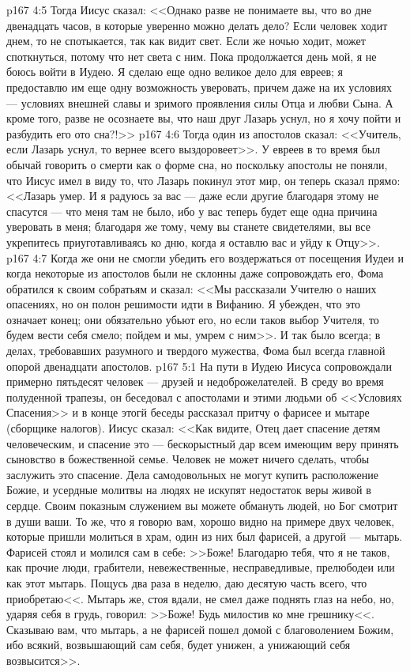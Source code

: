\vs p167 4:5 Тогда Иисус сказал: <<Однако разве не понимаете вы, что во дне двенадцать часов, в которые уверенно можно делать дело? Если человек ходит днем, то не спотыкается, так как видит свет. Если же ночью ходит, может споткнуться, потому что нет света с ним. Пока продолжается день мой, я не боюсь войти в Иудею. Я сделаю еще одно великое дело для евреев; я предоставлю им еще одну возможность уверовать, причем даже на их условиях --- условиях внешней славы и зримого проявления силы Отца и любви Сына. А кроме того, разве не осознаете вы, что наш друг Лазарь уснул, но я хочу пойти и разбудить его ото сна?!>>
\vs p167 4:6 Тогда один из апостолов сказал: <<Учитель, если Лазарь уснул, то вернее всего выздоровеет>>. У евреев в то время был обычай говорить о смерти как о форме сна, но поскольку апостолы не поняли, что Иисус имел в виду то, что Лазарь покинул этот мир, он теперь сказал прямо: <<Лазарь умер. И я радуюсь за вас --- даже если другие благодаря этому не спасутся --- что меня там не было, ибо у вас теперь будет еще одна причина уверовать в меня; благодаря же тому, чему вы станете свидетелями, вы все укрепитесь приуготавливаясь ко дню, когда я оставлю вас и уйду к Отцу>>.
\vs p167 4:7 Когда же они не смогли убедить его воздержаться от посещения Иудеи и когда некоторые из апостолов были не склонны даже сопровождать его, Фома обратился к своим собратьям и сказал: <<Мы рассказали Учителю о наших опасениях, но он полон решимости идти в Вифанию. Я убежден, что это означает конец; они обязательно убьют его, но если таков выбор Учителя, то будем вести себя смело; пойдем и мы, умрем с ним>>. И так было всегда; в делах, требовавших разумного и твердого мужества, Фома был всегда главной опорой двенадцати апостолов.
\vs p167 5:1 На пути в Иудею Иисуса сопровождали примерно пятьдесят человек --- друзей и недоброжелателей. В среду во время полуденной трапезы, он беседовал с апостолами и этими людьми об <<Условиях Спасения>> и в конце этогй беседы рассказал притчу о фарисее и мытаре (сборщике налогов). Иисус сказал: <<Как видите, Отец дает спасение детям человеческим, и спасение это --- бескорыстный дар всем имеющим веру принять сыновство в божественной семье. Человек не может ничего сделать, чтобы заслужить это спасение. Дела самодовольных не могут купить расположение Божие, и усердные молитвы на людях не искупят недостаток веры живой в сердце. Своим показным служением вы можете обмануть людей, но Бог смотрит в души ваши. То же, что я говорю вам, хорошо видно на примере двух человек, которые пришли молиться в храм, один из них был фарисей, а другой --- мытарь. Фарисей стоял и молился сам в себе: >>Боже! Благодарю тебя, что я не таков, как прочие люди, грабители, невежественные, несправедливые, прелюбодеи или как этот мытарь. Пощусь два раза в неделю, даю десятую часть всего, что приобретаю<<. Мытарь же, стоя вдали, не смел даже поднять глаз на небо, но, ударяя себя в грудь, говорил: >>Боже! Будь милостив ко мне грешнику<<. Сказываю вам, что мытарь, а не фарисей пошел домой с благоволением Божим, ибо всякий, возвышающий сам себя, будет унижен, а унижающий себя возвысится>>.
